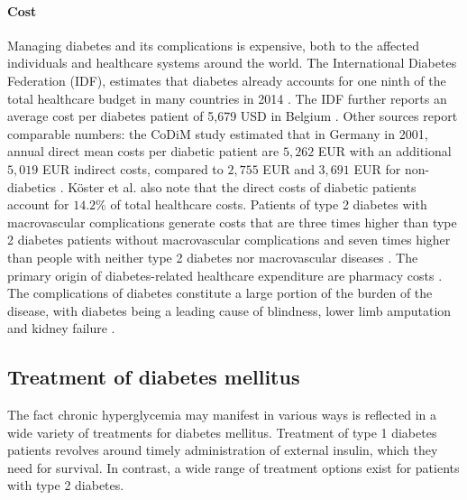 \paragraph{Cost} Managing diabetes and its complications is expensive, both to the affected individuals and healthcare systems around the world.  The International Diabetes Federation (IDF), estimates that diabetes already accounts for one ninth of the total healthcare budget in many countries in 2014 \citep{IDFfacts}. The IDF further reports an average cost per diabetes patient of 5,679 USD in Belgium \citep{IDFatlas}. Other sources report comparable numbers: the CoDiM study estimated that in Germany in 2001, annual direct mean costs per diabetic patient are $5,262$ EUR with an additional $5,019$ EUR indirect costs, compared to $2,755$ EUR and $3,691$ EUR for non-diabetics \citep{koster2006cost}. K\"oster et al. \citep{koster2006cost} also note that the direct costs of diabetic patients account for $14.2\%$ of total healthcare costs. Patients of type 2 diabetes with macrovascular complications generate costs that are three times higher than type 2 diabetes patients without macrovascular complications and seven times higher than people with neither type 2 diabetes nor macrovascular diseases \citep{beulens2010global}. The primary origin of diabetes-related healthcare expenditure are pharmacy costs \citep{nichols2002impact, gandra2006total}. The complications of diabetes constitute a large portion of the burden of the disease, with diabetes being a leading cause of blindness, lower limb amputation and kidney failure \citep{beulens2010global}. 





\subsection{Treatment of diabetes mellitus} \label{intro:treatment}
The fact chronic hyperglycemia may manifest in various ways is reflected in a wide variety of treatments for diabetes mellitus. Treatment of type 1 diabetes patients revolves around timely administration of external insulin, which they need for survival. In contrast, a wide range of treatment options exist for patients with type 2 diabetes.

